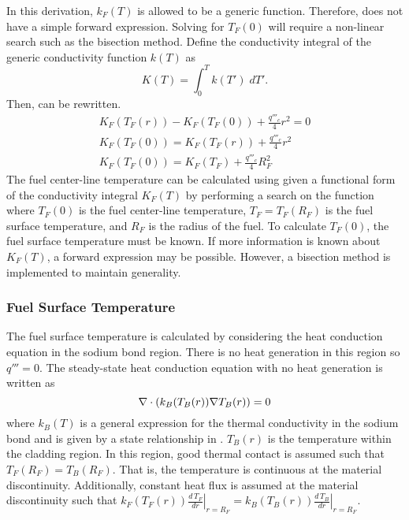       In this derivation, $k_F(T)$ is allowed to be a generic function. 
      Therefore,  does not have a simple forward 
      expression. Solving for $T_F(0)$ will require a non-linear search such as
      the bisection method. Define the conductivity integral of the generic
      conductivity function $k(T)$ as
      \begin{equation}
        \label{eq:conductivity_integral}
        K(T) = \int_0^T k(T') \; dT'.
      \end{equation}
      Then,  can be rewritten.
      \begin{gather}
        K_F(T_F(r)) - K_F(T_F(0)) + \frac{q'''_c}{4} r^2 = 0 \\
        K_F(T_F(0)) = K_F(T_F(r)) + \frac{q'''_c}{4} r^2 \\
        \label{eq:tcl_conductivity_integral}
        K_F(T_F(0)) = K_F(T_F) + \frac{q'''_c}{4} R_F^2
      \end{gather}
      The fuel center-line temperature can be calculated using
       given a functional form of the
      conductivity integral $K_F(T)$ by performing a search on the function
      where $T_F(0)$ is the fuel center-line temperature, $T_F=T_F(R_F)$ is the
      fuel surface temperature, and $R_F$ is the radius of the fuel. To
      calculate $T_F(0)$, the fuel surface temperature must be known.
      If more information is known about $K_F(T)$, a forward expression
      may be possible. However, a bisection method is implemented to maintain
      generality.

    \subsubsection{Fuel Surface Temperature}
      The fuel surface temperature is calculated by considering the heat
      conduction equation in the sodium bond region. There is no heat generation
      in this region so $q'''=0$.
      The steady-state heat conduction equation with no heat generation is
      written as
      \begin{equation}
        \label{eq:tc_grad}
        \mathbf{\nabla} \cdot (k_B(T_B(r)) \mathbf{\nabla} T_B(r)) = 0
      \end{equation}
      where $k_B(T)$ is a general expression for the thermal conductivity in the
      sodium bond and is given by a state relationship in \cite{sodiumProp}.
      $T_B(r)$ is the temperature within the cladding region.
      In this region, good thermal contact is
      assumed such that $T_F(R_F)=T_B(R_F)$. That is, the temperature is 
      continuous at the material discontinuity. Additionally, constant heat flux
      is assumed at the material discontinuity such that $k_F(T_F(r))
      \left.\frac{d\,T_F}{dr}\right|_{r=R_F} = k_B(T_B(r))
      \left.\frac{d\,T_B}{dr}\right|_{r=R_F}$.

